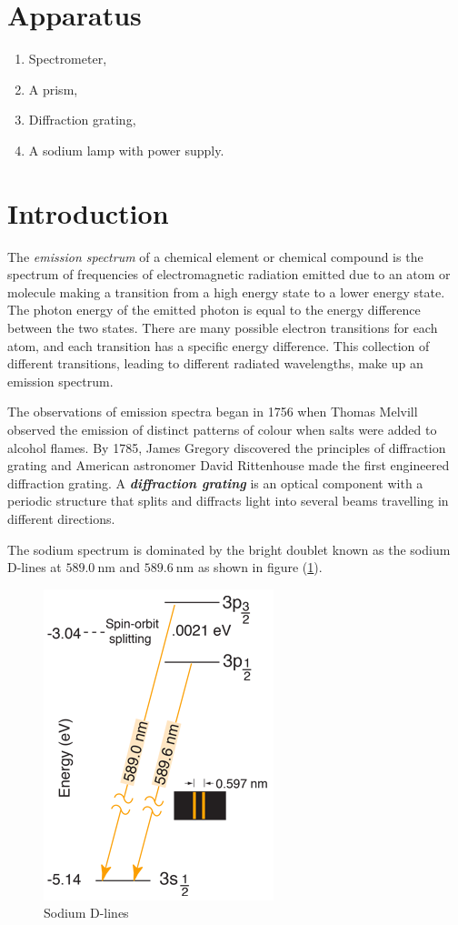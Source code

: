 \documentclass{article}
\begin{document}
\section{Apparatus}
\begin{enumerate}
    \item Spectrometer,
    \item A prism,
    \item Diffraction grating,
    \item A sodium lamp with power supply. 
\end{enumerate}

\section{Introduction}
\noindent
The \textit{emission spectrum} of a chemical element or chemical compound is the spectrum of frequencies of electromagnetic radiation emitted due to an atom or molecule making a transition from a high energy state to a lower energy state. The photon energy of the emitted photon is equal to the energy difference between the two states. There are many possible electron transitions for each atom, and each transition has a specific energy difference. This collection of different transitions, leading to different radiated wavelengths, make up an emission spectrum. 
\par
\noindent
The observations of emission spectra began in 1756 when Thomas Melvill observed the emission of distinct patterns of colour when salts were added to alcohol flames. By 1785, James Gregory discovered the principles of diffraction grating and American astronomer David Rittenhouse made the first engineered diffraction grating. A \textbf{\textit{diffraction grating}} is an optical component with a periodic structure that splits and diffracts light into several beams travelling in different directions.
\par
\noindent
The sodium spectrum is dominated by the bright 
doublet known as the sodium D-lines at $\SI{589.0}{\nano \metre}$ and $\SI{589.6}{\nano \metre}$ as shown in figure (\ref{fig:nalines}).
\begin{figure}[h!]
    \centering
    \includegraphics[scale = 0.5]{Figures/sodiumdlines.png}
    \caption{Sodium D-lines}
    \label{fig:nalines}
\end{figure}
\end{document}
